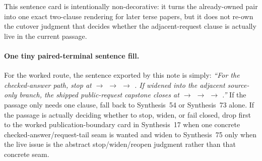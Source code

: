 \documentclass[11pt]{article}
\begin{document}
This sentence card is intentionally non-decorative: it turns the already-owned pair into one exact two-clause rendering for later terse papers, but it does not re-own the cutover judgment that decides whether the adjacent-request clause is actually live in the current passage.\cite{series:workedexample}

\paragraph{One tiny paired-terminal sentence fill.}
For the worked route, the sentence exported by this note is simply: \emph{``For the checked-answer path, stop at  $\to$  $\to$  $\to$ . If widened into the adjacent source-only branch, the shipped public-request capstone closes at  $\to$  $\to$  $\to$ .''} If the passage only needs one clause, fall back to Synthesis~54 or Synthesis~73 alone. If the passage is actually deciding whether to stop, widen, or fail closed, drop first to the worked publication-boundary card in Synthesis~17 when one concrete checked-answer/request-tail seam is wanted and widen to Synthesis~75 only when the live issue is the abstract stop/widen/reopen judgment rather than that concrete seam.
\end{document}
